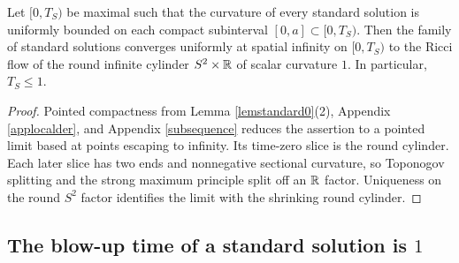 \begin{lemma}
  \label{lem:kl-blow-up-time-standard-solution-compactness-standard-solutions}
 \label{lemclaim2}
Let $[0,T_S)$ be maximal such that the curvature of every standard solution is
uniformly bounded on each compact subinterval $[0,a]\subset[0,T_S)$. Then the
family of standard solutions converges uniformly at spatial infinity on
$[0,T_S)$ to the Ricci flow of the round infinite cylinder $S^2\times{\mathbb R}$ of
scalar curvature $1$. In particular, $T_S\leq1$.
\end{lemma}
\begin{proof}
\sketch Pointed compactness from Lemma \ref{lemstandard0}(2), Appendix
\ref{applocalder}, and Appendix \ref{subsequence} reduces the assertion to a
pointed limit based at points escaping to infinity. Its time-zero slice is the
round cylinder. Each later slice has two ends and nonnegative sectional
curvature, so Toponogov splitting and the strong maximum principle split off an
${\mathbb R}$ factor. Uniqueness on the round $S^2$ factor identifies the limit with the
shrinking round cylinder.
\end{proof}

\subsection{The blow-up time of a standard solution is $1$}
\label{secclaim4}

